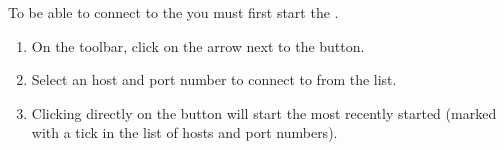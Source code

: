 

\label{connectserv}
To be able to connect to the \gdagent{} you must first start the \gdagent  {}.


\begin{enumerate}
\item On the toolbar, click on the arrow next to the  button. 
\item Select an \gdagent host and port number to connect to from the list. 
\item Clicking directly on the  button will start the most recently started \gdagent (marked with a tick in the list of \gdagent{} hosts and port numbers). 
\end{enumerate}
